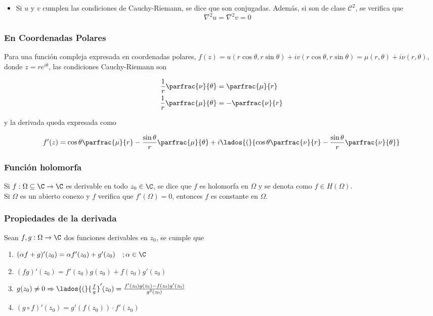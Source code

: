 \begin{itemize}
    \item Si $u$ y $v$ cumplen las condiciones de Cauchy-Riemann, se dice que son conjugadas. Además, si son de clase $\mathcal{C}^2$, se verifica que
    \[\nabla^2 u = \nabla^2 v = 0\]
\end{itemize}

\subsubsection{En Coordenadas Polares}

Para una función compleja expresada en coordenadas polares, $f(z)=u(r\cos{\theta},r\sin{\theta})+iv(r\cos{\theta},r\sin{\theta})=\mu(r,\theta)+i\nu(r,\theta)$, donde $z = re^{i\theta}$, las condiciones Cauchy-Riemann son

\begin{equation}
\begin{split}
    \frac{1}{r}\parfrac{\nu}{\theta}
    &=\parfrac{\mu}{r}\\
    \frac{1}{r}\parfrac{\mu}{\theta}
    &=-\parfrac{\nu}{r}\\
\end{split}
\nonumber
\end{equation}

y la derivada queda expresada como

\[f'(z)=\cos{\theta}\parfrac{\mu}{r}-
\frac{\sin{\theta}}{r}\parfrac{\mu}{\theta}+
i\lados{(}{\cos{\theta}\parfrac{\nu}{r}-
\frac{\sin{\theta}}{r}\parfrac{\nu}{\theta}}\]

\subsubsection{Función holomorfa}
Si $f:\Omega \subseteq \C \to \C$ es derivable en todo $z_0 \in \C$, se dice que $f$ es holomorfa en $\Omega$ y se denota como $f \in H(\Omega)$.\\


Si $\Omega$ es un abierto conexo y $f$ verifica que $f'(\Omega)=0$, entonces $f$ es constante en $\Omega$.

\subsubsection{Propiedades de la derivada}
Sean $f,g:\Omega \to \C$ dos funciones derivables en $z_0$, se cumple que
\begin{enumerate}[label=\roman*.]
    \item $(\alpha f + g)'(z_0) = \alpha f'(z_0) + g'(z_0) \quad; \alpha \in \C$
    \item $(fg)'(z_0) = f'(z_0)g(z_0) + f(z_0)g'(z_0)$
    \item $g(z_0) \ne 0 \Rightarrow \lados{(}{\frac{f}{g}}'(z_0) = \frac{f'(z_0)g(z_0) - f(z_0)g'(z_0)}{g^2(z_0)}$
    \item $(g \circ f)'(z_0) = g'(f(z_0))\cdot f'(z_0)$
\end{enumerate}

